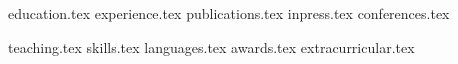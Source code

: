 \documentclass[letterpaper,11pt]{article}
\begin{document}


{education.tex}
{experience.tex}
{publications.tex}
{inpress.tex}
{conferences.tex}


{teaching.tex}
{skills.tex}
{languages.tex}
{awards.tex}
{extracurricular.tex}
\end{document}
